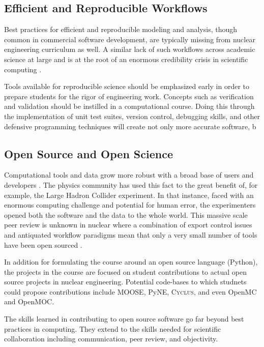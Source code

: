 \documentclass{anstrans}
\begin{document}
\subsection{Efficient and Reproducible Workflows}

Best practices for efficient and reproducible modeling and analysis, though
common in commercial software development, are typically missing from nuclear
engineering curriculum as well. A similar lack of such workflows across
academic science at large and is  at the root of an enormous credibility
crisis in scientific computing \cite{donoho_reproducible_2009,
stodden_scientific_2010}.

Tools available for reproducible science should be emphasized early in order to
prepare students for the rigor of engineering work. Concepts such as
verification and validation should be instilled in a computational course.
Doing this through the implementation of unit test suites, version control,
debugging skills, and other defensive programming techniques will create not
only more accurate software, b

\subsection{Open Source and Open Science}

Computational tools and data grow more robust with a broad base of users and
developers \cite{petre_code_2014, wicherts_willingness_2013}. The physics
community has used this fact to the great benefit of, for example, the Large
Hadron Collider experiment. In that instance, faced with an enormous computing
challenge and potential for human error, the experimenters opened both the
software and the data to the whole world. This massive scale peer review is
unknown in nuclear where a combination of export control issues and antiquated
workflow paradigms mean that only a very small number of tools have been open
sourced \cite{moose}\cite{pyne}\cite{cyclus}.

In addition for formulating the course around an open source language (Python),
the projects in the course are focused on student contributions to actual open source
projects in nuclear engineering. Potential code-bases to which studnets could
propose contributions include MOOSE\cite{gaston_moose_year},
PyNE\cite{scopatz_pyne_year}, \textsc{Cyclus}\cite{cyclus}, and
even OpenMC\cite{openmc} and OpenMOC\cite{openmoc}.

The skills learned in contributing to open source software go far beyond best
practices in computing. They extend to the skills needed for scientific
collaboration including communication, peer review, and objectivity.
\end{document}
